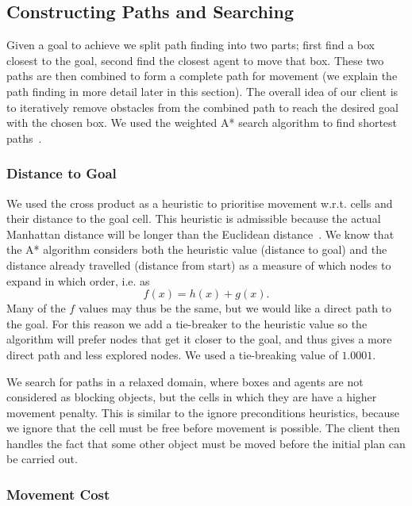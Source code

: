 \subsection{Constructing Paths and Searching}
\label{sec:constructing paths and searching}

Given a goal to achieve we split path finding into two parts; first find a box closest to the goal, second find the closest agent to move that box.
These two paths are then combined to form a complete path for movement (we explain the path finding in more detail later in this section).
The overall idea of our client is to iteratively remove obstacles from the combined path to reach the desired goal with the chosen box.
We used the weighted A* search algorithm to find shortest paths~\cite{pathfinding2016redblobgames,russell2009modern,pohl1969first}.

\subsubsection{Distance to Goal}

We used the cross product as a heuristic to prioritise movement w.r.t. cells and their distance to the goal cell.
This heuristic is admissible because the actual Manhattan distance will be longer than the Euclidean distance~\cite{russell2009modern}.
We know that the A* algorithm considers both the heuristic value (distance to goal) and the distance already travelled (distance from start) as a measure of which nodes to expand in which order, i.e. as 
\[
  f(x) = h(x) + g(x).
\]
Many of the $f$ values may thus be the same, but we would like a direct path to the goal.
For this reason we add a tie-breaker to the heuristic value so the algorithm will prefer nodes that get it closer to the goal, and thus gives a more direct path and less explored nodes.
We used a tie-breaking value of $1.0001$.~\cite{pathfinding2016redblobgames}

We search for paths in a relaxed domain, where boxes and agents are not considered as blocking objects, but the cells in which they are have a higher movement penalty.
This is similar to the ignore preconditions heuristics, because we ignore that the cell must be free before movement is possible.
The client then handles the fact that some other object must be moved before the initial plan can be carried out.

\subsubsection{Movement Cost}

